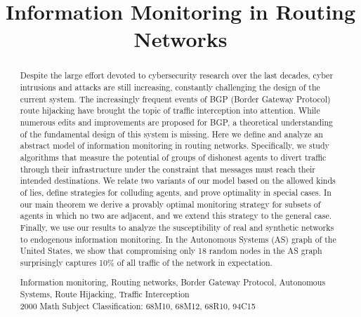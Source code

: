 \documentclass{comnet}
\begin{document}
\title{Information Monitoring in Routing Networks}


\author{
		\address{University of Pittsburgh}
		\address{Rice University}
		\address{University of Illinois at Chicago}
		\address{University of Chicago}
}

\maketitle

\begin{abstract}
{Despite the large effort devoted to cybersecurity research over the last decades, cyber intrusions and attacks are still increasing, constantly challenging the design of the current system. The increasingly frequent events of BGP (Border Gateway Protocol) route hijacking have brought the topic of traffic interception into attention. While numerous edits and improvements are proposed for BGP, a theoretical understanding of the fundamental design of this system is missing. Here we define and analyze an abstract model of information monitoring in routing networks. Specifically, we study algorithms that measure the potential of groups of
dishonest agents to divert traffic through their infrastructure under the constraint that messages must reach their intended destinations. We relate two variants of our model based on the allowed kinds of lies, define strategies for colluding agents, and prove optimality in special cases. In our main theorem we derive a provably optimal monitoring strategy for subsets of agents in which no two are adjacent, and we extend this strategy to the general case. Finally, we use our results to analyze the susceptibility of real and synthetic networks to endogenous information monitoring. In the Autonomous Systems (AS) graph of the United
States, we show that compromising only 18 random nodes in the AS graph surprisingly captures
10\% of all traffic of the network in expectation.}

{Information monitoring, Routing networks, Border Gateway Protocol, Autonomous Systems, Route Hijacking, Traffic Interception}
\\
2000 Math Subject Classification: 68M10, 68M12, 68R10, 94C15 
\end{abstract}
\end{document}
